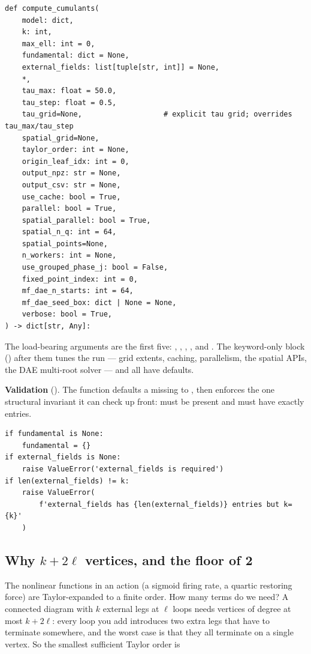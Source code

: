 \begin{lstlisting}
def compute_cumulants(
    model: dict,
    k: int,
    max_ell: int = 0,
    fundamental: dict = None,
    external_fields: list[tuple[str, int]] = None,
    *,
    tau_max: float = 50.0,
    tau_step: float = 0.5,
    tau_grid=None,                   # explicit tau grid; overrides tau_max/tau_step
    spatial_grid=None,
    taylor_order: int = None,
    origin_leaf_idx: int = 0,
    output_npz: str = None,
    output_csv: str = None,
    use_cache: bool = True,
    parallel: bool = True,
    spatial_parallel: bool = True,
    spatial_n_q: int = 64,
    spatial_points=None,
    n_workers: int = None,
    use_grouped_phase_j: bool = False,
    fixed_point_index: int = 0,
    mf_dae_n_starts: int = 64,
    mf_dae_seed_box: dict | None = None,
    verbose: bool = True,
) -> dict[str, Any]:
\end{lstlisting}

The load-bearing arguments are the first five: , ,
, , and . The keyword-only
block (\code{*}) after them tunes the run --- grid extents, caching, parallelism,
the spatial APIs, the DAE multi-root solver --- and all have defaults.

\textbf{Validation} (). The function defaults a
missing  to \code{\{\}}, then enforces the one structural
invariant it can check up front:  must be present and must
have exactly  entries.

\begin{lstlisting}
if fundamental is None:
    fundamental = {}
if external_fields is None:
    raise ValueError('external_fields is required')
if len(external_fields) != k:
    raise ValueError(
        f'external_fields has {len(external_fields)} entries but k={k}'
    )
\end{lstlisting}

\subsection{Why \texorpdfstring{$k + 2\ell$}{k + 2 ell} vertices, and the floor of 2}

The nonlinear functions in an action (a sigmoid firing rate, a quartic
restoring force) are Taylor-expanded to a finite order. How many terms do we
need? A connected diagram with $k$ external legs at $\ell$ loops needs vertices
of degree at most $k + 2\ell$: every loop you add introduces two extra legs that
have to terminate somewhere, and the worst case is that they all terminate on a
single vertex. So the smallest sufficient Taylor order is

